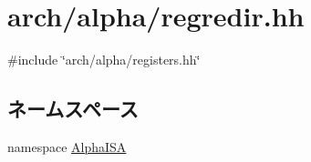 \hypertarget{regredir_8hh}{
\section{arch/alpha/regredir.hh}
\label{regredir_8hh}
}
{\ttfamily \#include \char`\"{}arch/alpha/registers.hh\char`\"{}}\par
\subsection*{ネームスペース}
\begin{DoxyCompactItemize}
\item 
namespace \hyperlink{namespaceAlphaISA}{AlphaISA}
\end{DoxyCompactItemize}

